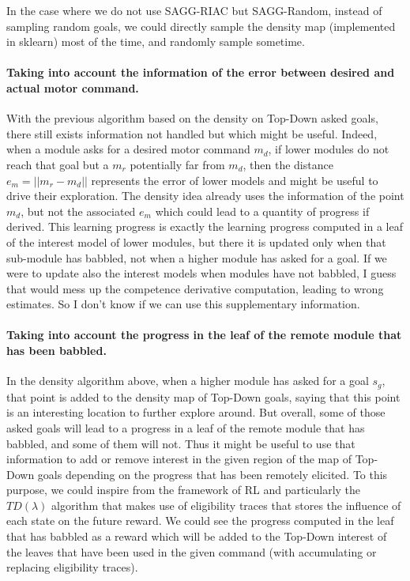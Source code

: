 \documentclass[12pt]{article}
\begin{document}
		In the case where we do not use SAGG-RIAC but SAGG-Random, instead of sampling random goals, we could directly sample the density map (implemented in sklearn) most of the time, and randomly sample sometime.
	
			
		\paragraph{Taking into account the information of the error between desired and actual motor command.}
		With the previous algorithm based on the density on Top-Down asked goals, there still exists information not handled but which might be useful.
		Indeed, when a module asks for a desired motor command $m_d$, if lower modules do not reach that goal but a $m_r$ potentially far from $m_d$, 
		then the distance $e_m = ||m_r - m_d||$ represents the error of lower models and might be useful to drive their exploration.
		The density idea already uses the information of the point $m_d$, but not the associated $e_m$ which could lead to a quantity of progress if derived.
		This learning progress is exactly the learning progress computed in a leaf of the interest model of lower modules, but there it is updated only when that sub-module has babbled, 
		not when a higher module has asked for a goal. If we were to update also the interest models when modules have not babbled, I guess that would mess up the competence derivative computation, leading to wrong estimates.
		So I don't know if we can use this supplementary information.
		
			
		\paragraph{Taking into account the progress in the leaf of the remote module that has been babbled.}
		In the density algorithm above, when a higher module has asked for a goal $s_g$, that point is added to the density map of Top-Down goals, 
		saying that this point is an interesting location to further explore around.
		But overall, some of those asked goals will lead to a progress in a leaf of the remote module that has babbled, and some of them will not.
		Thus it might be useful to use that information to add or remove interest in the given region of the map of Top-Down goals depending on the progress that has been remotely elicited.
		To this purpose, we could inspire from the framework of RL and particularly the $TD(\lambda)$ algorithm that makes use of eligibility traces that stores the influence of each state on the future reward.
		We could see the progress computed in the leaf that has babbled as a reward which will be added to the Top-Down interest of the leaves that have been used in the given command 
		(with accumulating or replacing eligibility traces).
		
\end{document}
